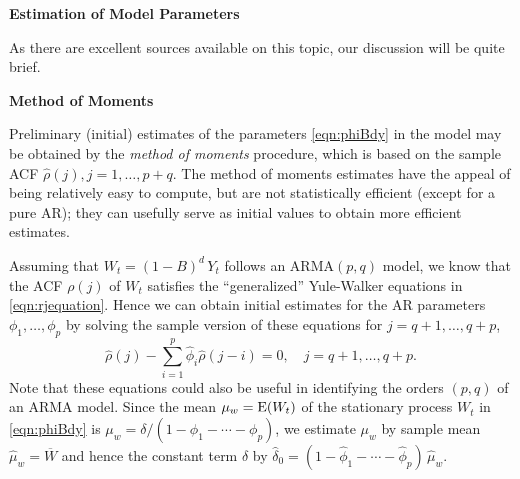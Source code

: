                                       
{\noindent\bfseries\large Estimation of Model Parameters} \twomedskip


As there are excellent sources available on this topic, our discussion will be quite brief. \twomedskip


\noindent \textbf{Method of Moments} \twomedskip


Preliminary (initial) estimates of the parameters \eqref{eqn:phiBdy} in the model may be obtained by the \textit{method of moments} procedure, which is based on the sample ACF $\hat{\rho}(j), j= 1, \ldots,  p+q$. The method of moments estimates have the appeal of being relatively easy to compute, but are not statistically efficient (except for a pure AR); they can usefully serve as initial values to obtain more efficient estimates.


Assuming that $W_t= (1 - B)^d\, Y_t$ follows an ARMA$(p,q)$ model, we know that the ACF $\rho(j)$ of $W_t$ satisfies the ``generalized'' Yule-Walker equations in \eqref{eqn:rjequation}. Hence we can obtain initial estimates for the AR parameters $\phi_1, \ldots, \phi_p$ by solving the sample version of these equations for $j= q+1,\ldots, q+p$,
	\begin{equation} \label{eqn:rhohatsum}
	\hat{\rho}(j) - \sum_{i=1}^p \hat{\phi}_i \hat{\rho}(j-i) = 0, \quad j= q+1, \ldots, q+p.
	\end{equation}
Note that these equations could also be useful in identifying the orders $(p,q)$ of an ARMA model. Since the mean $\mu_w = \operatorname{E}(W_t)$ of the stationary process $W_t$ in \eqref{eqn:phiBdy} is $\mu_w = \delta/(1 - \phi_1 - \cdots - \phi_p)$, we estimate $\mu_w$ by sample mean $\hat{\mu}_w = \overline{W}$ and hence the constant term $\delta$ by $\hat{\delta}_0 = (1 - \hat{\phi}_1 - \cdots - \hat{\phi}_p)\, \hat{\mu}_w$.


